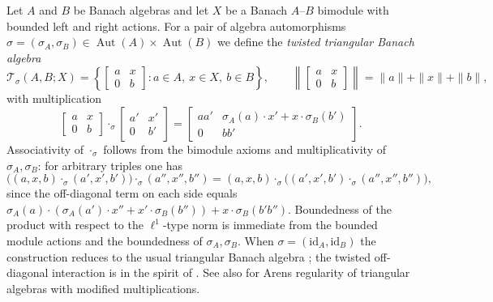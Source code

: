 \documentclass{article}
\theoremstyle{plain}
\theoremstyle{definition}
\newcommand{\T}{\mathcal{T}}
\newcommand{\Aut}{\operatorname{Aut}}
\begin{document}
Let \(A\) and \(B\) be Banach algebras and let \(X\) be a Banach \(A\)--\(B\) bimodule with bounded left and right actions.
For a pair of algebra automorphisms \(\sigma=(\sigma_A,\sigma_B)\in \Aut(A)\times \Aut(B)\) we define the \emph{twisted triangular Banach algebra}
\[
\T_\sigma(A,B;X)
=\left\{\begin{bmatrix}a&x\\[2pt]0&b\end{bmatrix}: a\in A,\ x\in X,\ b\in B\right\},
\qquad
\left\|\begin{bmatrix}a&x\\[2pt]0&b\end{bmatrix}\right\|=\|a\|+\|x\|+\|b\|,
\]
with multiplication
\[
\begin{bmatrix}a&x\\[2pt]0&b\end{bmatrix}
\cdot_\sigma
\begin{bmatrix}a'&x'\\[2pt]0&b'\end{bmatrix}
=
\begin{bmatrix}
aa' & \sigma_A(a)\cdot x' + x\cdot \sigma_B(b')\\[2pt]
0   & bb'
\end{bmatrix}.
\]
Associativity of \(\cdot_\sigma\) follows from the bimodule axioms and multiplicativity of \(\sigma_A,\sigma_B\): for arbitrary triples one has
\[
\bigl((a,x,b)\cdot_\sigma(a',x',b')\bigr)\cdot_\sigma(a'',x'',b'')
=
(a,x,b)\cdot_\sigma\bigl((a',x',b')\cdot_\sigma(a'',x'',b'')\bigr),
\]
since the off-diagonal term on each side equals
\(\sigma_A(a)\cdot(\sigma_A(a')\cdot x'' + x'\cdot\sigma_B(b'')) + x\cdot \sigma_B(b'b'')\).
Boundedness of the product with respect to the \(\ell^1\)-type norm is immediate from the bounded module actions and the boundedness of \(\sigma_A,\sigma_B\).
When \(\sigma=(\mathrm{id}_A,\mathrm{id}_B)\) the construction reduces to the usual triangular Banach algebra \cite{ForrestMarcouxWA,MoslehianTriangular}; the twisted off-diagonal interaction is in the spirit of \cite{BehnamianMahmoodi2020}. See also \cite{BehnamianMahmoodi2021} for Arens regularity of triangular algebras with modified multiplications.
\end{document}

